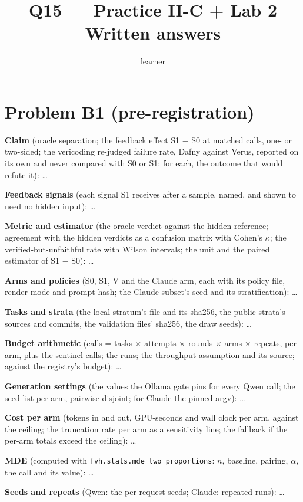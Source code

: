 \documentclass[11pt]{article}
\title{Q15 --- Practice II-C + Lab 2 \\ \large Written answers}
\author{learner}
\date{}
\begin{document}
\maketitle

\section*{Problem B1 (pre-registration)}\label{ans:B1}
\begin{answer}
\textbf{Claim} (oracle separation; the feedback effect S1 $-$ S0 at matched
calls, one- or two-sided; the vericoding re-judged failure rate, Dafny against
Verus, reported on its own and never compared with S0 or S1; for each, the
outcome that would refute it): \dots

\textbf{Feedback signals} (each signal S1 receives after a sample, named, and
shown to need no hidden input): \dots

\textbf{Metric and estimator} (the oracle verdict against the hidden reference;
agreement with the hidden verdicts as a confusion matrix with Cohen's
$\kappa$; the verified-but-unfaithful rate with Wilson intervals; the unit and
the paired estimator of S1 $-$ S0): \dots

\textbf{Arms and policies} (S0, S1, V and the Claude arm, each with its policy
file, render mode and prompt hash; the Claude subset's seed and its
stratification): \dots

\textbf{Tasks and strata} (the local stratum's file and its sha256, the public
strata's sources and commits, the validation files' sha256, the draw seeds):
\dots

\textbf{Budget arithmetic} (calls = tasks $\times$ attempts $\times$ rounds
$\times$ arms $\times$ repeats, per arm, plus the sentinel calls; the runs; the
throughput assumption and its source; against the registry's budget): \dots

\textbf{Generation settings} (the values the Ollama gate pins for every Qwen
call; the seed list per arm, pairwise disjoint; for Claude the pinned argv):
\dots

\textbf{Cost per arm} (tokens in and out, GPU-seconds and wall clock per arm,
against the ceiling; the truncation rate per arm as a sensitivity line; the
fallback if the per-arm totals exceed the ceiling): \dots

\textbf{MDE} (computed with \texttt{fvh.stats.mde\_two\_proportions}: $n$,
baseline, pairing, $\alpha$, the call and its value): \dots

\textbf{Seeds and repeats} (Qwen: the per-request seeds; Claude: repeated
runs): \dots


\end{answer}
\end{document}
